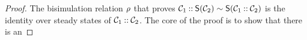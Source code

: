 \begin{proof}
The bisimulation relation $\mathrel{\rho}$ that proves $\mathcal{C}_1\mathbin{{:}{:}} \mathsf{S}(\mathcal{C}_2) \sim \mathsf{S}(\mathcal{C}_1\mathbin{{:}{:}} \mathcal{C}_2)$ is the identity over steady states of $\mathcal{C}_1\mathbin{{:}{:}} \mathcal{C}_2$. The core of the proof is to show that there is an 
\end{proof}
\begin{comment}
For any set of actions $A\subseteq \Lambda$, the \emph{identity transducer} $\cI_A$ is a trivial, one-state $A$-to-$A$ transducer, where the one state (say $q$) is both initial and final, and there are transitions from $q$ to $q$ for all $a\in A$ that merely convert $a$ into itself. Formally, this is given by $\cI_A=\tupof{\setof q,q,T,\setof q,\setof{(q,0)}}$ for some arbitrary $q$, where $T$ is generated by
%
\begin{center}
\AxiomC{$a\in A$}
\UnaryInfC{$q\tduce a a q$}
\DisplayProof
\end{center}
%
Note that $\cI_A$ is both large-step and small-step. The identity transducer acts as the identity of composition, both on large-step and on small-step transducers. Moreover, the composition of small-step transducers is consistent with that of their closure.
%
\begin{proposition}
Let $\cS_i$ be $A_i$-to-$C_i$ transducers for $i=1,2,3$, with $A_i=C_{i+1}$ for $i=1,2$. The following equalities hold, if all $\cS_i$ are either large-step or small-step:
\begin{align*}
\cS_1\on(\cS_2\on \cS_3) & \equiv (\cS_1\on \cS_2)\on \cS_3 \\
\cS_1\on \cI_{C_1} & \equiv \cS_1 \\
\cI_{A_1}\on \cS_1 & \equiv \cS_2 \enspace.
\end{align*}
If $\cS_1$ and $\cS_2$ are small-step, then in addition the following holds:
\begin{align*}
\close \cS_1\on \close \cS_2 & \equiv \closex{\cS_1\on \cS_2} \enspace.
\end{align*}
Finally, if $\cS_2$ is a transition system, then so is $\cS_1\on \cS_2$.
\end{proposition}
%
A \emph{large-step $A$-to-$C$ refinement function} is a function $R:A\to \powersetof{C^+}$ for some sets $A,C\subseteq \Lab$ of abstract, respectively concrete actions. This essentially implements all abstract actions as sequences of concrete actions: a given abstract $a\in A$ is implemented as a choice of any non-empty sequence of concrete actions $\sigma\in R(a)$. The effect of $R$ is captured by the single-state large-step transducer $\cR_R=\tupof{\setof p,p,T,\setof p,\setof{(p,0)}}$, where $p$ is some arbitrary fresh state and $T$ is defined by
%
\begin{center}
\AxiomC{$a\in A$}
\AxiomC{$\sigma\in R(a)$}
\BinaryInfC{$p\Tduce a\sigma p$}
\DisplayProof
\end{center}
%
Given a large-step $A$-to-$C$ refinement function $R$, we can now either \emph{refine} a $D$-to-$A$ transducer $\cS$ by applying it to $\cR_R$ (as in $\cS\on \cR_R$) or \emph{abstract} a $C$-to-$D$ transducer $\cS$ by applying $\cR_R$ to it (as in $\cR_R\on \cS$).


\end{comment}
